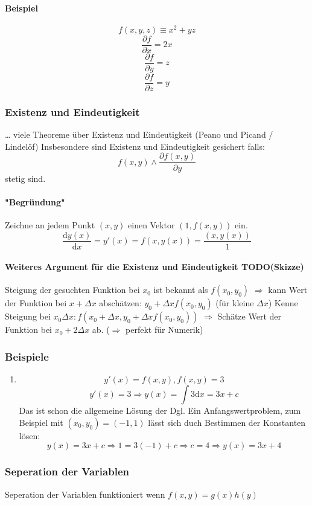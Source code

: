 \documentclass[a4paper]{scrartcl}
\renewcommand{\d}{\mathrm{d}}
\newcommand{\f}[2]{\frac{#1}{#2}}
\theoremstyle{definition}
\theoremstyle{plain}
\theoremstyle{remark}
\begin{document}
\paragraph{Beispiel}
\label{sec-3-3-3-1}
\[f(x,y,z) \equiv x^2 + y z\]
\[\f{\partial f}{\partial x} = 2x\]
\[\f{\partial f}{\partial y} = z\]
\[\f{\partial f}{\partial z} = y\]
\subsubsection{Existenz und Eindeutigkeit}
\label{sec-3-3-4}
\ldots{} viele Theoreme über Existenz und Eindeutigkeit (Peano und Picand / Lindelöf)
Insbesondere sind Existenz und Eindeutigkeit gesichert falls:
\[f(x,y) \wedge \f{\partial f(x,y)}{\partial y}\]
stetig sind.
\paragraph{"Begründung"}
\label{sec-3-3-4-1}
Zeichne an jedem Punkt $(x,y)$ einen Vektor $(1,f(x,y))$ ein.
\[\f{\d y(x)}{\d x} = y'(x) = f(x,y(x)) = \f{(x,y(x))}{1}\]
\paragraph{Weiteres Argument für die Existenz und Eindeutigkeit TODO(Skizze)}
\label{sec-3-3-4-2}
Steigung der gesuchten Funktion bei $x_0$ ist bekannt als $f(x_0, y_0)$
$\Rightarrow$ kann Wert der Funktion bei $x + \Delta x$ abschätzen: $y_0 + \Delta x f(x_0,y_0)$ (für kleine $\Delta x$)
Kenne Steigung bei $x_0 \Delta x: f(x_0 + \Delta x, y_0 + \Delta x f(x_0,y_0))$
$\Rightarrow$ Schätze Wert der Funktion bei $x_0 + 2\Delta x$ ab. ($\Rightarrow$ perfekt für Numerik)
\subsubsection{Beispiele}
\label{sec-3-3-5}
\begin{enumerate}
\item \[y'(x) = f(x,y), f(x,y) = 3\]
\[y'(x) = 3 \Rightarrow y(x) = \int 3\d x = 3 x + c\]
Das ist schon die allgemeine Lösung der Dgl.
Ein Anfangswertproblem, zum Beispiel mit $(x_0, y_0) = (-1,1)$ lässt sich duch Bestimmen der Konstanten lösen:
\[y(x) = 3 x + c \Rightarrow 1 = 3(-1) + c \Rightarrow c = 4 \Rightarrow y(x) = 3x + 4\]
\end{enumerate}
\subsubsection{Seperation der Variablen}
\label{sec-3-3-6}
Seperation der Variablen funktioniert wenn $f(x,y) = g(x)h(y)$
\end{document}
